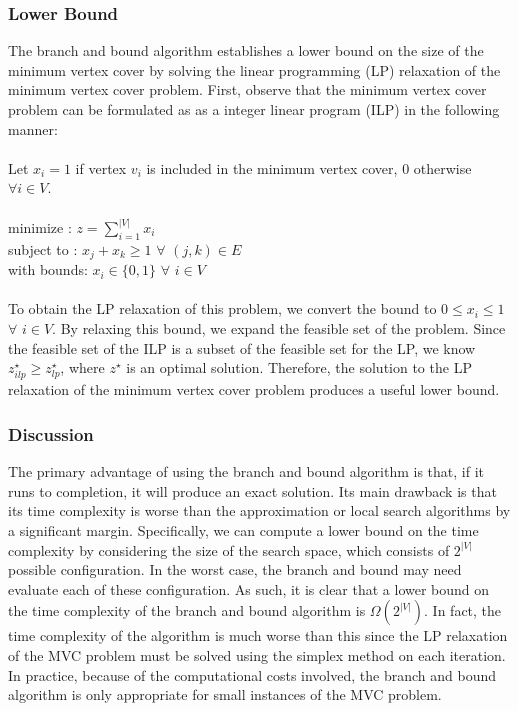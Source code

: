 \documentclass{sig-alternate-05-2015}
\begin{document}
\subsubsection{Lower Bound}
The branch and bound algorithm establishes a lower bound on the size of the minimum vertex cover by solving the linear programming (LP) relaxation of the minimum vertex cover problem. First, observe that the minimum vertex cover problem can be formulated as as a integer linear program (ILP) in the following manner:
\\
\\
Let $x_i = 1$ if vertex $v_i$ is included in the minimum vertex cover, $0$ otherwise $\forall i \in V$.
\\
\\
minimize   : $z=\sum_{i=1}^{|V|} x_i$
\\
subject to : $x_j + x_k \geq 1$ $ \forall$ $ (j,k) \in E$
\\
with bounds: $ x_i \in \lbrace 0,1 \rbrace$ $\forall$ $i \in V$
\\
\\
To obtain the LP relaxation of this problem, we convert the bound to $ 0 \leq x_i \leq 1$ $\forall$ $i \in V$. By relaxing this bound, we expand the feasible set of the problem. Since the feasible set of the ILP is a subset of the feasible set for the LP, we know $z_{ilp}^{\star} \geq z_{lp}^{\star}$, where $z^{\star}$ is an optimal solution. Therefore, the solution to the LP relaxation of the minimum vertex cover problem produces a useful lower bound.
\subsubsection{Discussion}
The primary advantage of using the branch and bound algorithm is that, if it runs to completion, it will produce an exact solution. Its main drawback is that its time complexity is worse than the approximation or local search algorithms by a significant margin. Specifically, we can compute a lower bound on the time complexity by considering the size of the search space, which consists of $2^{|V|}$ possible configuration. In the worst case, the branch and bound may need evaluate each of these configuration. As such, it is clear that a lower bound on the time complexity of the branch and bound algorithm is $\Omega (2^{|V|})$. In fact, the time complexity of the algorithm is much worse than this since the LP relaxation of the MVC problem must be solved using the simplex method on each iteration. In practice, because of the computational costs involved, the branch and bound algorithm is only appropriate for small instances of the MVC problem.
\end{document}

